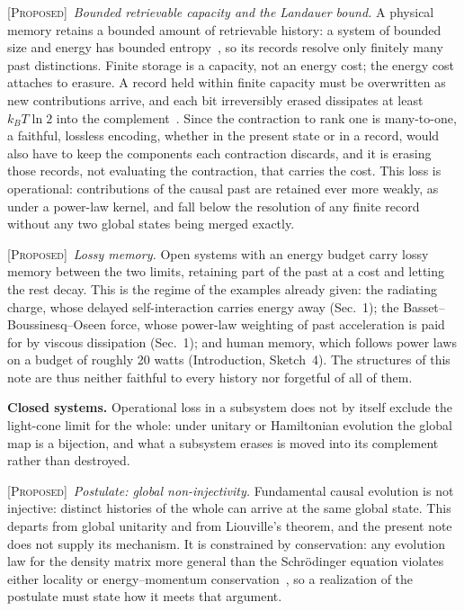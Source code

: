 \documentclass[10pt]{article}
\newcommand{\Proposed}{\noindent\textsc{[Proposed]}\ }
\begin{document}
\Proposed \textit{Bounded retrievable capacity and the Landauer bound.} A physical memory retains a bounded amount of retrievable history: a system of bounded size and energy has bounded entropy~\cite{bekenstein1981}, so its records resolve only finitely many past distinctions. Finite storage is a capacity, not an energy cost; the energy cost attaches to erasure. A record held within finite capacity must be overwritten as new contributions arrive, and each bit irreversibly erased dissipates at least $k_BT\ln2$ into the complement~\cite{landauer,bennett2003}. Since the contraction to rank one is many-to-one, a faithful, lossless encoding, whether in the present state or in a record, would also have to keep the components each contraction discards, and it is erasing those records, not evaluating the contraction, that carries the cost. This loss is operational: contributions of the causal past are retained ever more weakly, as under a power-law kernel, and fall below the resolution of any finite record without any two global states being merged exactly.

\Proposed \textit{Lossy memory.} Open systems with an energy budget carry lossy memory between the two limits, retaining part of the past at a cost and letting the rest decay. This is the regime of the examples already given: the radiating charge, whose delayed self-interaction carries energy away (Sec.~1); the Basset--Boussinesq--Oseen force, whose power-law weighting of past acceleration is paid for by viscous dissipation (Sec.~1); and human memory, which follows power laws on a budget of roughly 20 watts (Introduction, Sketch~4). The structures of this note are thus neither faithful to every history nor forgetful of all of them.

\smallskip
\noindent\textbf{Closed systems.} Operational loss in a subsystem does not by itself exclude the light-cone limit for the whole: under unitary or Hamiltonian evolution the global map is a bijection, and what a subsystem erases is moved into its complement rather than destroyed.

\Proposed \textit{Postulate: global non-injectivity.} Fundamental causal evolution is not injective: distinct histories of the whole can arrive at the same global state. This departs from global unitarity and from Liouville's theorem, and the present note does not supply its mechanism. It is constrained by conservation: any evolution law for the density matrix more general than the Schr\"odinger equation violates either locality or energy--momentum conservation~\cite{bankssusskindpeskin}, so a realization of the postulate must state how it meets that argument.
\end{document}
